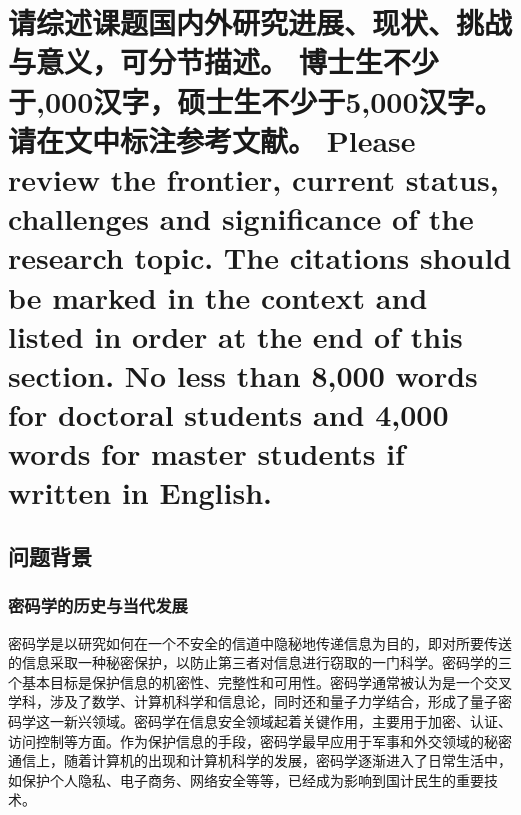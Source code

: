 \documentclass[a4paper,zihao=-4,AutoFakeBold]{ctexart}
\begin{document}
\vspace{-2\baselineskip}

\kaishu\setlength{\parskip}{0.5\baselineskip}\linespread{1.75}\selectfont

\makeatletter
{}
\makeatother




\section{请综述课题国内外研究进展、现状、挑战与意义，可分节描述。
    博士生不少于,000汉字，硕士生不少于5,000汉字。请在文中标注参考文献。 
    Please review the frontier, current status, 
    challenges and significance of the research topic. 
    The citations should be marked in the context 
    and listed in order at the end of this section. 
    No less than 8,000 words for doctoral students 
    and 4,000 words for master students if written in English.}

\subsection{问题背景}
\subsubsection{密码学的历史与当代发展}
密码学是以研究如何在一个不安全的信道中隐秘地传递信息为目的，即对所要传送的信息采取一种秘密保护，以防止第三者对信息进行窃取的一门科学。密码学的三个基本目标是保护信息的机密性、完整性和可用性。密码学通常被认为是一个交叉学科，涉及了数学、计算机科学和信息论，同时还和量子力学结合，形成了量子密码学这一新兴领域。密码学在信息安全领域起着关键作用，主要用于加密、认证、访问控制等方面。作为保护信息的手段，密码学最早应用于军事和外交领域的秘密通信上，随着计算机的出现和计算机科学的发展，密码学逐渐进入了日常生活中，如保护个人隐私、电子商务、网络安全等等，已经成为影响到国计民生的重要技术。
\end{document}

